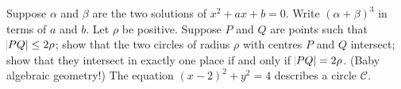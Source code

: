 \begin{questions}
  \question Suppose $ \alpha $ and $ \beta $ are the two solutions of $ x^2 + ax + b = 0 $. Write $ (\alpha + \beta)^3 $ in terms
            of $ a $ and $ b $.
  \question Let $ \rho $ be positive. Suppose $ P $ and $ Q $ are points such that $ \abs{PQ} \leq 2\rho $;
            show that the two circles of radius $ \rho $ with centres $ P $ and $ Q $ intersect;
            show that they intersect in exactly one place if and only if $ \abs{PQ} = 2\rho $.
  \question (Baby algebraic geometry!) The equation $ (x - 2)^2 + y^2 = 4 $ describes a circle $\mathcal{C}$.
\end{questions}
